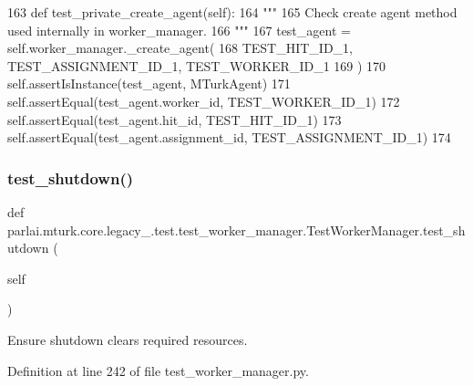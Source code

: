 \begin{DoxyCode}
163     \textcolor{keyword}{def }test\_private\_create\_agent(self):
164         \textcolor{stringliteral}{"""}
165 \textcolor{stringliteral}{        Check create agent method used internally in worker\_manager.}
166 \textcolor{stringliteral}{        """}
167         test\_agent = self.worker\_manager.\_create\_agent(
168             TEST\_HIT\_ID\_1, TEST\_ASSIGNMENT\_ID\_1, TEST\_WORKER\_ID\_1
169         )
170         self.assertIsInstance(test\_agent, MTurkAgent)
171         self.assertEqual(test\_agent.worker\_id, TEST\_WORKER\_ID\_1)
172         self.assertEqual(test\_agent.hit\_id, TEST\_HIT\_ID\_1)
173         self.assertEqual(test\_agent.assignment\_id, TEST\_ASSIGNMENT\_ID\_1)
174 
\end{DoxyCode}
\mbox{\label{classparlai_1_1mturk_1_1core_1_1legacy__2018_1_1test_1_1test__worker__manager_1_1TestWorkerManager_a71aaa44341e8b99f4593484de1bd2459}} 
\subsubsection{\texorpdfstring{test\+\_\+shutdown()}{test\_shutdown()}}
{\footnotesize\ttfamily def parlai.\+mturk.\+core.\+legacy\+\_.\+test.\+test\+\_\+worker\+\_\+manager.\+Test\+Worker\+Manager.\+test\+\_\+shutdown (\begin{DoxyParamCaption}\item[{}]{self }\end{DoxyParamCaption})}

\begin{DoxyVerb}Ensure shutdown clears required resources.
\end{DoxyVerb}
 

Definition at line 242 of file test\+\_\+worker\+\_\+manager.\+py.


